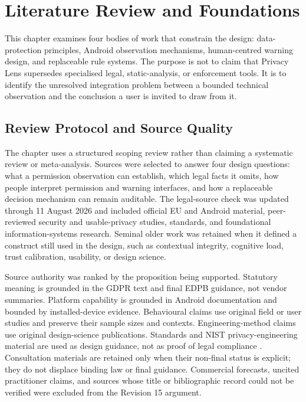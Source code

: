 \section{Literature Review and Foundations}

This chapter examines four bodies of work that constrain the design: data-protection principles, Android observation mechanisms, human-centred warning design, and replaceable rule systems. The purpose is not to claim that Privacy Lens supersedes specialised legal, static-analysis, or enforcement tools. It is to identify the unresolved integration problem between a bounded technical observation and the conclusion a user is invited to draw from it.

\subsection{Review Protocol and Source Quality}

The chapter uses a structured scoping review rather than claiming a systematic review or meta-analysis. Sources were selected to answer four design questions: what a permission observation can establish, which legal facts it omits, how people interpret permission and warning interfaces, and how a replaceable decision mechanism can remain auditable. The legal-source check was updated through 11 August 2026 and included official EU and Android material, peer-reviewed security and usable-privacy studies, standards, and foundational information-systems research. Seminal older work was retained when it defined a construct still used in the design, such as contextual integrity, cognitive load, trust calibration, usability, or design science.

Source authority was ranked by the proposition being supported. Statutory meaning is grounded in the GDPR text and final EDPB guidance, not vendor summaries. Platform capability is grounded in Android documentation and bounded by installed-device evidence. Behavioural claims use original field or user studies and preserve their sample sizes and contexts. Engineering-method claims use original design-science publications. Standards and NIST privacy-engineering material are used as design guidance, not as proof of legal compliance \cite{nist8062,nistprivacy2020}. Consultation materials are retained only when their non-final status is explicit; they do not displace binding law or final guidance. Commercial forecasts, uncited practitioner claims, and sources whose title or bibliographic record could not be verified were excluded from the Revision 15 argument.

